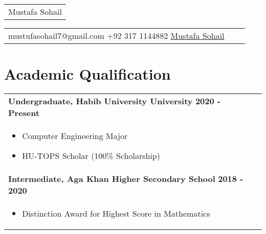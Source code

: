 \documentclass[a4paper,8pt]{article}
\begin{document}
\pagestyle{empty} 

\begin{tabularx}{\linewidth}{@{} C @{}}
\Huge{Mustafa Sohail} \\[6pt]
\end{tabularx}

\begin{tabularx}{\linewidth}{@{} C @{} C @{} C}
{{\raisebox{-0.05\height}{\faEnvelope} mustufasohail7@gmail.com}} 
{{\raisebox{-0.05\height}{\faMobile} +92 317 1144882}} 
{{\href{https://www.linkedin.com/in/nameisjamiele}{\raisebox{-0.05\height}{\faLinkedin} \href{https://www.linkedin.com/in/mustafa-sohail-187ab4206/}{Mustafa Sohail}}}}
\end{tabularx}

\section{\textbf{Academic Qualification}}
\begin{tabularx}{\linewidth}{ @{}l r@{}}
\textbf{Undergraduate, Habib University University} \hfill \textbf{2020 - Present} \\[4pt]
\begin{minipage}[t]{\linewidth}
    \begin{itemize}[nosep, after=\strut, leftmargin=1em, itemsep=2pt]
        \item Computer Engineering Major
        \item HU-TOPS Scholar (100\% Scholarship)
    \end{itemize}
\end{minipage} \\[4pt]


\textbf{Intermediate, Aga Khan Higher Secondary School} \hfill \textbf{2018 - 2020}\\[4pt]
\begin{minipage}[t]{\linewidth}
    \begin{itemize}[nosep, after=\strut, leftmargin=1em, itemsep=2pt]
        \item Distinction Award for Highest Score in Mathematics
    \end{itemize}
\end{minipage}
\end{tabularx}

\end{document}
